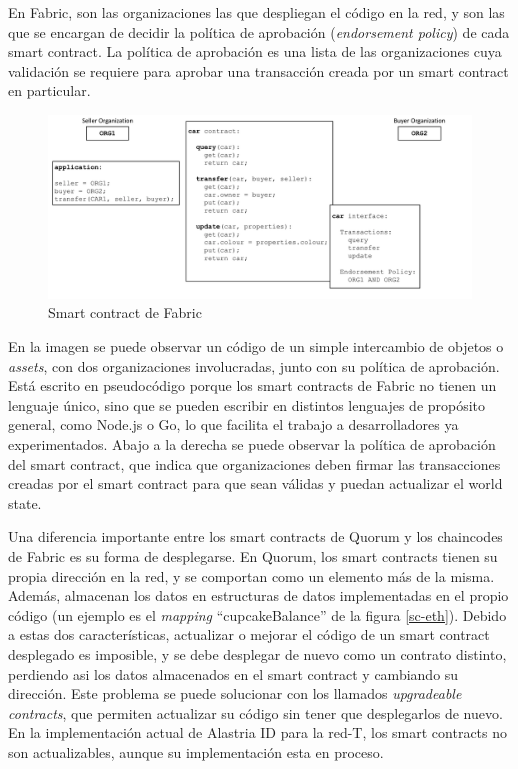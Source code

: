 En Fabric, son las organizaciones las que despliegan el código en la red, y son las que se encargan de decidir la política de aprobación (\textit{endorsement policy}) de cada smart contract. La política de aprobación es una lista de las organizaciones cuya validación se requiere para aprobar una transacción creada por un smart contract en particular.
\begin{figure}[H]
\centerline{\includegraphics[scale=0.35]{recursos/SC-FABRIC-END.png}}
\caption{Smart contract de Fabric \cite{chaincodes}}
\label{sc-fabric}
\end{figure}
En la imagen se puede observar un código de un simple intercambio de objetos o \textit{assets}, con dos organizaciones involucradas, junto con su política de aprobación. Está escrito en pseudocódigo porque los smart contracts de Fabric no tienen un lenguaje único, sino que se pueden escribir en distintos lenguajes de propósito general, como Node.js o Go, lo que facilita el trabajo a desarrolladores ya experimentados. Abajo a la derecha se puede observar la política de aprobación del smart contract, que indica que organizaciones deben firmar las transacciones creadas por el smart contract para que sean válidas y puedan actualizar el world state.

Una diferencia importante entre los smart contracts de Quorum y los chaincodes de Fabric es su forma de desplegarse.
En Quorum, los smart contracts tienen su propia dirección en la red, y se comportan como un elemento más de la misma. Además, almacenan los datos en estructuras de datos implementadas en el propio código (un ejemplo es el \textit{mapping} ``cupcakeBalance'' de la figura \ref{sc-eth}). Debido a estas dos características, actualizar o mejorar el código de un smart contract desplegado es imposible, y se debe desplegar de nuevo como un contrato distinto, perdiendo asi los datos almacenados en el smart contract y cambiando su dirección. Este problema se puede solucionar con los llamados \textit{upgradeable contracts}, que permiten actualizar su código sin tener que desplegarlos de nuevo. En la implementación actual de Alastria ID para la red-T, los smart contracts no son actualizables, aunque su implementación esta en proceso.

